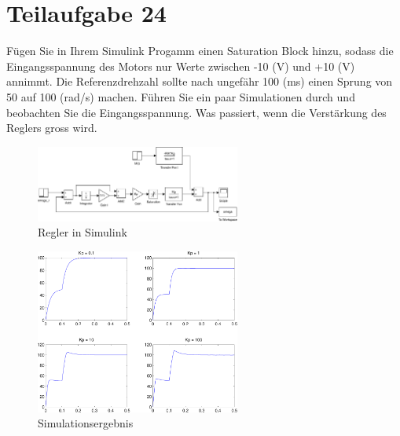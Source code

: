 \section{Teilaufgabe 24}
\begin{aufgabe}
    Fügen Sie in Ihrem Simulink Progamm einen Saturation Block hinzu, sodass 
    die Eingangsspannung des Motors nur Werte zwischen -10 (V) und +10 (V) 
    annimmt.  Die Referenzdrehzahl sollte nach ungefähr 100 (ms) einen Sprung 
    von 50 auf 100 (rad/s) machen. Führen Sie ein paar Simulationen durch und 
    beobachten Sie die Eingangsspannung. Was passiert, wenn die Verstärkung 
    des Reglers gross wird.
\end{aufgabe}
\begin{figure}[h!]
    \centering
    \includegraphics[width=0.6\textwidth]{24/regler_sat.pdf}
    \caption{Regler in Simulink}
    \label{fig:24}
\end{figure}
\begin{figure}[h!]
    \centering
    \includegraphics[width=0.6\textwidth]{24/regler_sat_plot.pdf}
    \caption{Simulationsergebnis}
    \label{fig:24plot}
\end{figure}

